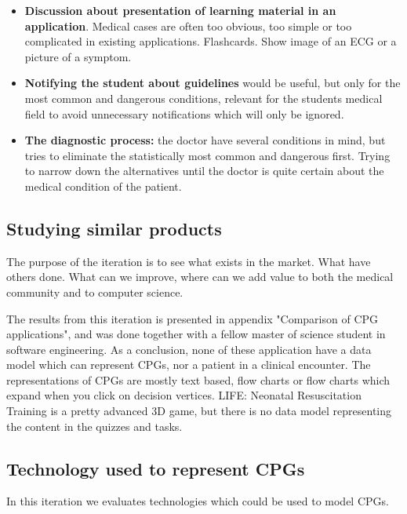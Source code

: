 \begin{itemize}
	\item \textbf{Discussion about presentation of learning material in an application}. Medical cases are often too obvious, too simple or too complicated in existing applications. Flashcards. Show image of an ECG or a picture of a symptom.
	\item \textbf{Notifying the student about guidelines} would be useful, but only for the most common and dangerous conditions, relevant for the students medical field to avoid unnecessary notifications which will only be ignored.
	\item \textbf{The diagnostic process:} the doctor have several conditions in mind, but tries to eliminate the statistically most common and dangerous first. Trying to narrow down the alternatives until the doctor is quite certain about the medical condition of the patient.
	
\end{itemize}

\subsection{Studying similar products}
The purpose of the iteration is to see what exists in the market. What have others done. What can we improve, where can we add value to both the medical community and to computer science.

The results from this iteration is presented in appendix "Comparison of CPG applications", and was done together with a fellow master of science student in software engineering. As a conclusion, none of these application have a data model which can represent CPGs, nor a patient in a clinical encounter. The representations of CPGs are mostly text based, flow charts or flow charts which expand when you click on decision vertices. LIFE: Neonatal Resuscitation Training is a pretty advanced 3D game, but there is no data model representing the content in the quizzes and tasks.

\subsection{Technology used to represent CPGs}
In this iteration we evaluates technologies which could be used to model CPGs.


